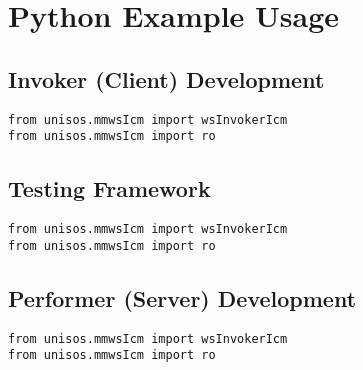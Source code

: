 \documentclass{article}
\begin{document}
\section{Python Example Usage}

\subsection{Invoker (Client) Development}

\begin{verbatim}
from unisos.mmwsIcm import wsInvokerIcm
from unisos.mmwsIcm import ro
\end{verbatim}

\subsection{Testing Framework}

\begin{verbatim}
from unisos.mmwsIcm import wsInvokerIcm
from unisos.mmwsIcm import ro
\end{verbatim}

\subsection{Performer (Server) Development}

\begin{verbatim}
from unisos.mmwsIcm import wsInvokerIcm
from unisos.mmwsIcm import ro
\end{verbatim}




\begin{comment}
*  [[elisp:(org-cycle)][| ]]  *DBLK: main-end*                                       :: [[elisp:(beginning-of-buffer)][Top]] [[elisp:(delete-other-windows)][(1)]]  [[elisp:(org-cycle)][| ]]
\end{comment}
\end{document}

